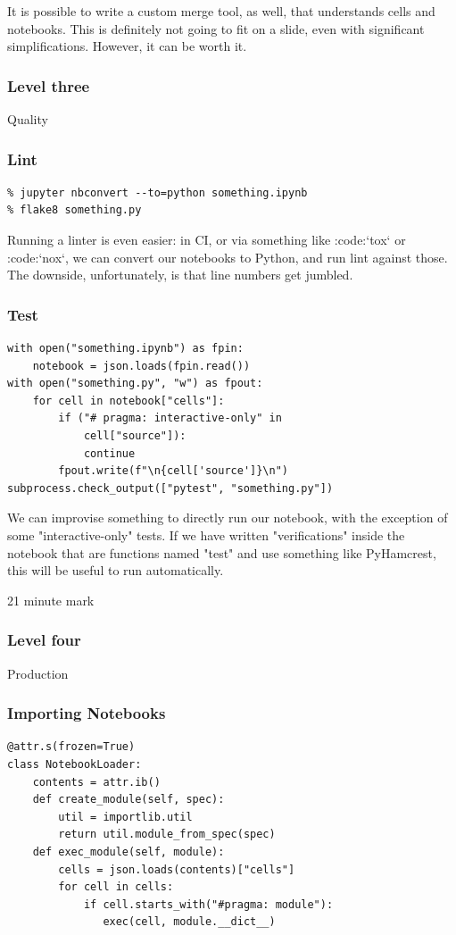 It is possible to write a custom merge tool,
as well,
that understands cells and notebooks.
This is definitely not going to fit on a slide,
even with significant simplifications.
However,
it can be worth it.

\begin{frame}
\frametitle{Level three}

Quality
\end{frame}

\begin{frame}[fragile]

\frametitle{Lint}

\begin{lstlisting}
% jupyter nbconvert --to=python something.ipynb
% flake8 something.py
\end{lstlisting}

\end{frame}

Running a linter is even easier:
in CI,
or via something like :code:`tox`
or :code:`nox`,
we can convert our notebooks to Python,
and run lint against those.
The downside,
unfortunately,
is that line numbers get jumbled.

\begin{frame}[fragile]
\frametitle{Test}

\begin{lstlisting}
with open("something.ipynb") as fpin:
    notebook = json.loads(fpin.read())
with open("something.py", "w") as fpout:
    for cell in notebook["cells"]:
        if ("# pragma: interactive-only" in
            cell["source"]):
            continue
        fpout.write(f"\n{cell['source']}\n")
subprocess.check_output(["pytest", "something.py"])
\end{lstlisting}

\end{frame}

We can improvise something to directly run our notebook,
with the exception of some "interactive-only"
tests.
If we have written "verifications" inside the notebook
that are functions named "test" and use something like
PyHamcrest,
this will be useful to run automatically.

21 minute mark

\begin{frame}
\frametitle{Level four}

Production
\end{frame}

\begin{frame}[fragile]
\frametitle{Importing Notebooks}

\begin{lstlisting}
@attr.s(frozen=True)
class NotebookLoader:
    contents = attr.ib()
    def create_module(self, spec):
        util = importlib.util
        return util.module_from_spec(spec)
    def exec_module(self, module):
        cells = json.loads(contents)["cells"]
        for cell in cells:
            if cell.starts_with("#pragma: module"):
               exec(cell, module.__dict__)
\end{lstlisting}

\end{frame}

